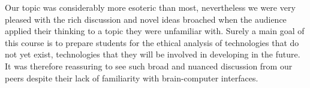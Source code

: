 \documentclass[12pt]{article}
\begin{document}
Our topic was considerably more esoteric than most, nevertheless we were very pleased with the rich discussion and novel ideas broached when the audience applied their thinking to a topic they were unfamiliar with. Surely a main goal of this course is to prepare students for the ethical analysis of technologies that do not yet exist, technologies that they will be involved in developing in the future. It was therefore reassuring to see such broad and nuanced discussion from our peers despite their lack of familiarity with brain-computer interfaces.
\end{document}

